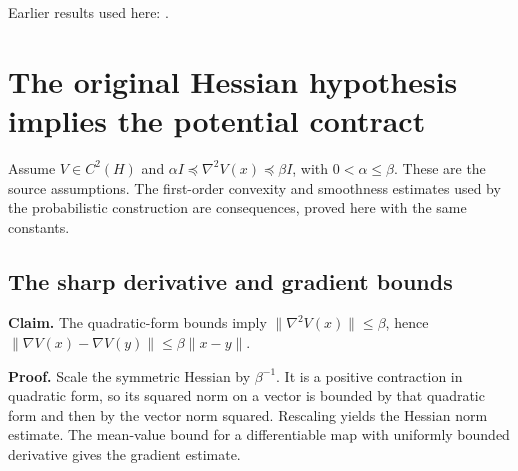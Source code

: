 \documentclass[11pt,a4paper]{report}
\begin{document}
Earlier results used here: \cite[Section~3.26.3]{LangevinLean2026ULASC}.
\section{\texorpdfstring{The original Hessian hypothesis implies the potential contract}{The original Hessian hypothesis implies the potential contract}}
\label{proof-module-WassersteinMixing-CurvatureAssumptions-lean}


Assume \(V\in C^2(H)\) and \(\alpha I\preceq\nabla^2V(x)\preceq\beta I\), with \(0<\alpha\le\beta\). These are the source assumptions. The first-order convexity and smoothness estimates used by the probabilistic construction are consequences, proved here with the same constants.

\subsection{\texorpdfstring{The sharp derivative and gradient bounds}{The sharp derivative and gradient bounds}}
\label{report-step-WassersteinMixing-CurvatureAssumptions-lean-1}


\textbf{Claim.} The quadratic-form bounds imply \(\|\nabla^2V(x)\|\le\beta\), hence \(\|\nabla V(x)-\nabla V(y)\|\le\beta\|x-y\|\).



\textbf{Proof.} Scale the symmetric Hessian by \(\beta^{-1}\). It is a positive contraction in quadratic form, so its squared norm on a vector is bounded by that quadratic form and then by the vector norm squared. Rescaling yields the Hessian norm estimate. The mean-value bound for a differentiable map with uniformly bounded derivative gives the gradient estimate.
\end{document}
